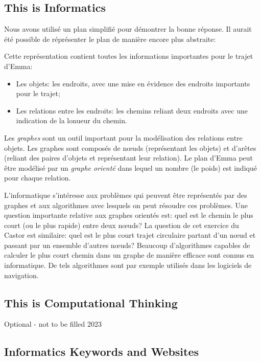 \documentclass[a4paper,11pt]{report}
\newcommand{\taskGraphicsFolder}{..}
\begin{document}
\subsection*{This is Informatics}

Nous avons utilisé un plan simplifié pour démontrer la bonne réponse. Il aurait été possible de réprésenter le plan de manière encore plus abstraite:

{\centering%
\par}

Cette représentation contient toutes les informations importantes pour le trajet d’Emma:

\begin{itemize}
  \item Les objets: les endroits, avec une mise en évidence des endroits importants pour le trajet;
  \item Les relations entre les endroits: les chemins reliant deux endroits avec une indication de la lonueur du chemin.
\end{itemize}

Les \emph{graphes} sont un outil important pour la modélisation des relations entre objets. Les graphes sont composés de nœuds (représentant les objets) et d’arêtes (reliant des paires d’objets et représentant leur relation). Le plan d’Emma peut être modélisé par un \emph{graphe orienté} dans lequel un nombre (le poids) est indiqué pour chaque relation.

L’informatique s’intéresse aux problèmes qui peuvent être représentés par des graphes et aux algorithmes avec lesquels on peut résoudre ces problèmes. Une question importante relative aux graphes orientés est: quel est le chemin le plus court (ou le plus rapide) entre deux nœuds? La question de cet exercice du Castor est similaire: quel est le plus court trajet circulaire partant d’un nœud et passant par un ensemble d’autres nœuds? Beaucoup d’algorithmes capables de calculer le plus court chemin dans un graphe de manière efficace sont connus en informatique. De tels algorithmes sont par exemple utilisés dans les logiciels de navigation.


\subsection*{This is Computational Thinking}

Optional - not to be filled 2023


\subsection*{Informatics Keywords and Websites}
\end{document}
